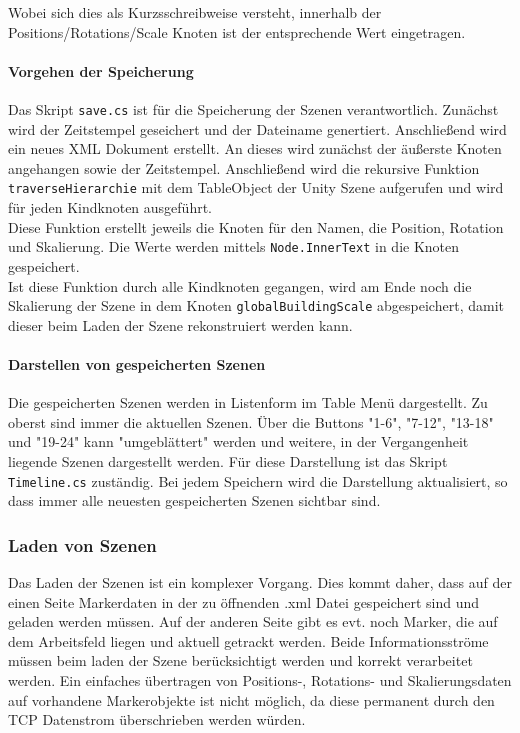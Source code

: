 Wobei sich dies als Kurzsschreibweise versteht, innerhalb der Positions/Rotations/Scale Knoten ist der entsprechende Wert eingetragen.

\paragraph{Vorgehen der Speicherung}
Das Skript \texttt{save.cs} ist für die Speicherung der Szenen verantwortlich. Zunächst wird der Zeitstempel geseichert und der Dateiname genertiert. Anschließend wird ein neues XML Dokument erstellt. An dieses wird zunächst der äußerste Knoten angehangen sowie der Zeitstempel. Anschließend wird die rekursive Funktion \texttt{traverseHierarchie} mit dem TableObject der Unity Szene aufgerufen und wird für jeden Kindknoten ausgeführt. \\
Diese Funktion erstellt jeweils die Knoten für den Namen, die Position, Rotation und Skalierung. Die Werte werden mittels \texttt{Node.InnerText} in die Knoten gespeichert.\\
Ist diese Funktion durch alle Kindknoten gegangen, wird am Ende noch die Skalierung der Szene in dem Knoten \texttt{globalBuildingScale} abgespeichert, damit dieser beim Laden der Szene rekonstruiert werden kann.

\paragraph{Darstellen von gespeicherten Szenen} Die gespeicherten Szenen werden in Listenform im Table Menü dargestellt. Zu oberst sind immer die aktuellen Szenen. Über die Buttons "1-6", "7-12", "13-18" und "19-24" kann "umgeblättert" werden und weitere, in der Vergangenheit liegende Szenen dargestellt werden. Für diese Darstellung ist das Skript \texttt{Timeline.cs} zuständig. Bei jedem Speichern wird die Darstellung aktualisiert, so dass immer alle neuesten gespeicherten Szenen sichtbar sind.

\subsubsection{Laden von Szenen}
\label{Laden}
Das Laden der Szenen ist ein komplexer Vorgang. Dies kommt daher, dass auf der einen Seite Markerdaten in der zu öffnenden .xml Datei gespeichert sind und geladen werden müssen. Auf der anderen Seite gibt es evt. noch Marker, die auf dem Arbeitsfeld liegen und aktuell getrackt werden. Beide Informationsströme müssen beim laden der Szene berücksichtigt werden und korrekt verarbeitet werden. Ein einfaches übertragen von Positions-, Rotations- und Skalierungsdaten auf vorhandene Markerobjekte ist nicht möglich, da diese permanent durch den TCP Datenstrom überschrieben werden würden.
